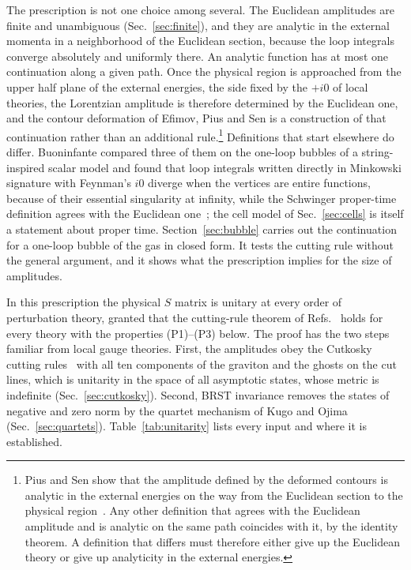 \documentclass[a4paper,11pt]{article}
\begin{document}
The prescription is not one choice among several. The Euclidean amplitudes are finite and unambiguous (Sec.~\ref{sec:finite}), and they are analytic in the external momenta in a neighborhood of the Euclidean section, because the loop integrals converge absolutely and uniformly there. An analytic function has at most one continuation along a given path. Once the physical region is approached from the upper half plane of the external energies, the side fixed by the $+i0$ of local theories, the Lorentzian amplitude is therefore determined by the Euclidean one, and the contour deformation of Efimov, Pius and Sen is a construction of that continuation rather than an additional rule.\footnote{Pius and Sen show that the amplitude defined by the deformed contours is analytic in the external energies on the way from the Euclidean section to the physical region~\cite{PiusSen2016}. Any other definition that agrees with the Euclidean amplitude and is analytic on the same path coincides with it, by the identity theorem. A definition that differs must therefore either give up the Euclidean theory or give up analyticity in the external energies.} Definitions that start elsewhere do differ. Buoninfante compared three of them on the one-loop bubbles of a string-inspired scalar model and found that loop integrals written directly in Minkowski signature with Feynman's $i0$ diverge when the vertices are entire functions, because of their essential singularity at infinity, while the Schwinger proper-time definition agrees with the Euclidean one~\cite{Buoninfante2022}; the cell model of Sec.~\ref{sec:cells} is itself a statement about proper time. Section~\ref{sec:bubble} carries out the continuation for a one-loop bubble of the gas in closed form. It tests the cutting rule without the general argument, and it shows what the prescription implies for the size of amplitudes.

In this prescription the physical $S$ matrix is unitary at every order of perturbation theory, granted that the cutting-rule theorem of Refs.~\cite{PiusSen2016,BrisceseModesto2019} holds for every theory with the properties (P1)--(P3) below. The proof has the two steps familiar from local gauge theories. First, the amplitudes obey the Cutkosky cutting rules~\cite{Cutkosky1960} with all ten components of the graviton and the ghosts on the cut lines, which is unitarity in the space of all asymptotic states, whose metric is indefinite (Sec.~\ref{sec:cutkosky}). Second, BRST invariance removes the states of negative and zero norm by the quartet mechanism of Kugo and Ojima (Sec.~\ref{sec:quartets}). Table~\ref{tab:unitarity} lists every input and where it is established.
\end{document}
